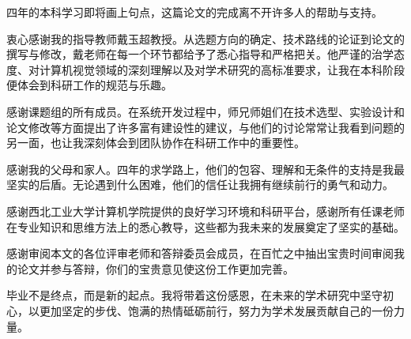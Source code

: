 
\begin{acknowledgements}

四年的本科学习即将画上句点，这篇论文的完成离不开许多人的帮助与支持。

衷心感谢我的指导教师戴玉超教授。从选题方向的确定、技术路线的论证到论文的撰写与修改，戴老师在每一个环节都给予了悉心指导和严格把关。他严谨的治学态度、对计算机视觉领域的深刻理解以及对学术研究的高标准要求，让我在本科阶段便体会到科研工作的规范与乐趣。

感谢课题组的所有成员。在系统开发过程中，师兄师姐们在技术选型、实验设计和论文修改等方面提出了许多富有建设性的建议，与他们的讨论常常让我看到问题的另一面，也让我深刻体会到团队协作在科研工作中的重要性。

感谢我的父母和家人。四年的求学路上，他们的包容、理解和无条件的支持是我最坚实的后盾。无论遇到什么困难，他们的信任让我拥有继续前行的勇气和动力。

感谢西北工业大学计算机学院提供的良好学习环境和科研平台，感谢所有任课老师在专业知识和思维方法上的悉心教导，这些都为我未来的发展奠定了坚实的基础。

感谢审阅本文的各位评审老师和答辩委员会成员，在百忙之中抽出宝贵时间审阅我的论文并参与答辩，你们的宝贵意见使这份工作更加完善。

毕业不是终点，而是新的起点。我将带着这份感恩，在未来的学术研究中坚守初心，以更加坚定的步伐、饱满的热情砥砺前行，努力为学术发展贡献自己的一份力量。

\end{acknowledgements}